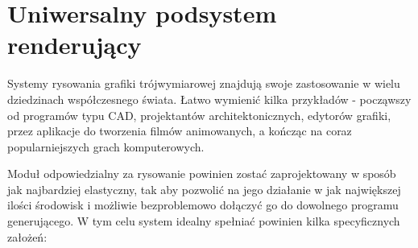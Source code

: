 \chapter{Uniwersalny podsystem renderujący}

Systemy rysowania grafiki trójwymiarowej znajdują swoje zastosowanie w wielu dziedzinach współczesnego świata. Łatwo wymienić kilka przykładów - począwszy od programów typu CAD, projektantów architektonicznych, edytorów grafiki, przez aplikacje do tworzenia filmów animowanych, a kończąc na coraz popularniejszych grach komputerowych.

Moduł odpowiedzialny za rysowanie powinien zostać zaprojektowany w sposób jak najbardziej elastyczny, tak aby pozwolić na jego działanie w jak największej ilości środowisk i możliwie bezproblemowo dołączyć go do dowolnego programu generującego. W tym celu system idealny spełniać powinien kilka specyficznych założeń:

